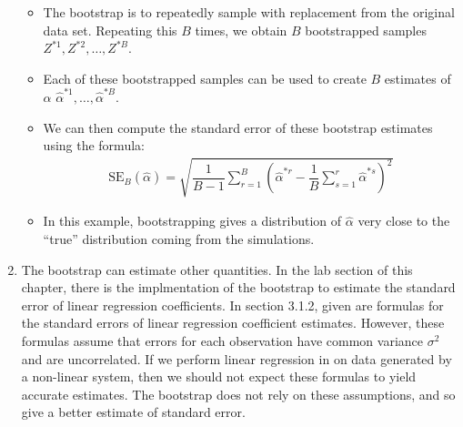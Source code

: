 \documentclass[10pt]{article}
\begin{document}
\begin{enumerate}
\begin{itemize}
		\item The bootstrap is to repeatedly sample with replacement from the original data set.  Repeating this $B$ times, we obtain $B$ bootstrapped samples $Z^{*1}, Z^{*2}, \dots, Z^{*B}$.
		\item Each of these bootstrapped samples can be used to create $B$ estimates of $\alpha$ $\hat\alpha^{*1}, \dots, \hat \alpha^{*B}$.
		\item We can then compute the standard error of these bootstrap estimates using the formula:
		\begin{align*}
			\mathrm{SE}_B(\hat\alpha) = \sqrt{\dfrac{1}{B- 1} \sum_{r = 1}^B \left(\hat\alpha^{*r} - \dfrac{1}{B} \sum_{s = 1}^r \hat\alpha^{*s} \right)^2}
		\end{align*}
		\item In this example, bootstrapping gives a distribution of $\hat \alpha$ very close to the ``true'' distribution coming from the simulations.
	\end{itemize}
	\item The bootstrap can estimate other quantities.  In the lab section of this chapter, there is the implmentation of the bootstrap to estimate the standard error of linear regression coefficients.  In section 3.1.2, given are formulas for the standard errors of linear regression coefficient estimates.  However, these formulas assume that errors for each observation have common variance $\sigma^2$ and are uncorrelated.  If we perform linear regression in on data generated by a non-linear system, then we should not expect these formulas to yield accurate estimates.  The bootstrap does not rely on these assumptions, and so give a better estimate of standard error.

\end{enumerate}
\end{document}
